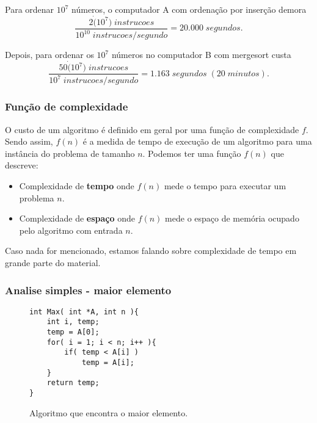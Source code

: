 Para ordenar $10^7$ números, o computador A com ordenação por inserção demora
\begin{equation*}
\frac{2\dot (10^7)\; instrucoes}{10^{10}\; instrucoes/segundo} = 20.000 \; segundos.
\end{equation*}

Depois, para ordenar os $10^7$ números no computador B com mergesort custa
\begin{equation*}
\frac{50 \dot (10^7)\; instrucoes}{10^{7}\; instrucoes/segundo} = 1.163 \; segundos \;(20\; minutos).
\end{equation*}

\subsubsection{Função de complexidade}

O custo de um algoritmo é definido em geral por uma função de complexidade $f$. Sendo assim,
$f(n)$ é a medida de tempo de execução de um algoritmo para uma instância do problema de tamanho $n$.
Podemos ter uma função $f(n)$ que descreve:
\begin{itemize}
\item Complexidade de {\bf tempo} onde $f(n)$ mede o tempo para executar um problema $n$.
\item Complexidade de {\bf espaço} onde $f(n)$ mede o espaço de memória ocupado pelo algoritmo
com entrada $n$.
\end{itemize}

Caso nada for mencionado, estamos falando sobre complexidade de tempo em grande parte do material.

\subsubsection{Analise simples - maior elemento}

\begin{figure}[!htb]
\centering
\begin{framed}
\begin{lstlisting}
int Max( int *A, int n ){
	int i, temp;
	temp = A[0];
	for( i = 1; i < n; i++ ){
		if( temp < A[i] )
			temp = A[i];
	}
	return temp;
}
\end{lstlisting}
\end{framed}
\caption{Algoritmo que encontra o maior elemento.}
\end{figure}


